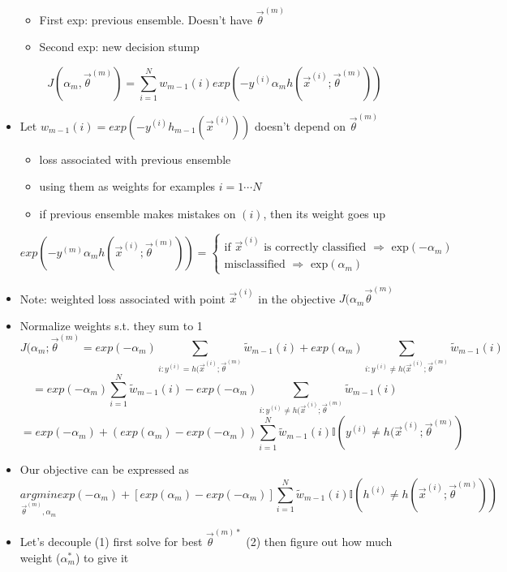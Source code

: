 \documentclass[10pt, oneside]{article}
\begin{document}
\begin{itemize}
    \begin{itemize}
        \item First exp: previous ensemble. Doesn't have $\vec \theta^{(m)} $
        \item Second exp: new decision stump
    \end{itemize}
    \[J(\alpha_m, \vec \theta^{(m)}) =\sum_{i=1}^N w_{m-1} (i) exp(-y^{(i)} \alpha_m h(\vec x^{(i)} ; \vec \theta^{(m)}))\]
    \item Let $w_{m-1}(i) = exp(-y^{(i)} h_{m-1} (\vec x^{(i)}))$ doesn't depend on $\vec \theta ^{(m)}$
    \begin{itemize}
        \item loss associated with previous ensemble
        \item using them as weights for examples $i=1\cdots N$
        \item if previous ensemble makes mistakes on $(i)$, then its weight goes up
    \end{itemize}
    \[exp(-y^{(m)} \alpha_m h(\vec x^{(i)} ; \vec \theta^{(m)})) = \begin{cases}
        \text{if $\vec x^{(i)}$ is correctly classified $\Rightarrow$ exp$(-\alpha_m)$}\\
        \text{misclassified $\Rightarrow$ exp$(\alpha_m)$}
    \end{cases}\]
    \item Note: weighted loss associated with point $\vec x^{(i)}$ in the objective $J(\alpha_m \vec \theta^{(m)}$
    \item Normalize weights s.t. they sum to 1
    \[J(\alpha_m; \vec \theta^{(m)} = exp(-\alpha_m) \underset{i: y^{(i)} = h(\vec x^{(i)} ; \vec \theta^{(m)}}{\sum} \tilde w_{m-1} (i) + exp(\alpha_m ) \underset{i: y^{(i)} \neq h(\vec x^{(i)} ; \vec \theta^{(m)}}{\sum} \tilde w_{m-1} (i)\]
    \[=exp(-\alpha_m) \sum_{i=1}^N \tilde w_{m-1} (i) - exp(-\alpha_m) \underset{i: y^{(i)} \neq h(\vec x^{(i)} ; \vec \theta^{(m)}}{\sum} \tilde w_{m-1}(i)\]
    \[=exp(-\alpha_m) + (exp(\alpha_m ) - exp(-\alpha_m)) \sum_{i=1}^N \tilde w_{m-1}(i) \mathbb{I} \left( y^{(i)} \neq h(\vec x^{(i)} ; \vec \theta^{(m)}\right)\]
    \item Our objective can be expressed as \[\underset{\vec \theta^{(m)}, \alpha_m}{argmin} exp(-\alpha_m ) + [exp(\alpha_m) - exp(-\alpha_m)] \sum_{i=1}^N \tilde w_{m-1} (i) \mathbb{I} \left(h^{(i)} \neq h(\vec x^{(i)} ; \vec \theta^{(m)})\right)\]
    \item Let's decouple (1) first solve for best $\vec \theta^{(m)*}$ (2) then figure out how much weight ($\alpha_m^*$) to give it

\end{itemize}
\end{document}
